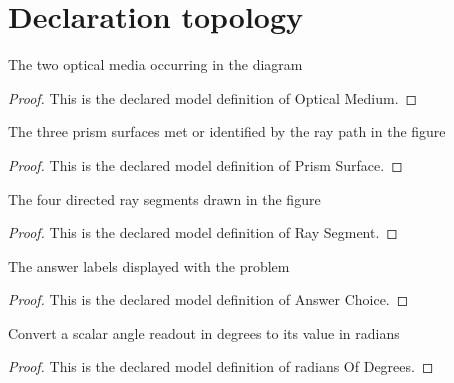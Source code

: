 \section{Declaration topology}
\begin{definition}
  \label{def:physics:phyx-mini-0017:phyxminiproblems-problem0017-opticalmedium}
  The two optical media occurring in the diagram
\end{definition}
\begin{proof}
  This is the declared model definition of Optical Medium.
\end{proof}
\begin{definition}
  \label{def:physics:phyx-mini-0017:phyxminiproblems-problem0017-prismsurface}
  The three prism surfaces met or identified by the ray path in the figure
\end{definition}
\begin{proof}
  This is the declared model definition of Prism Surface.
\end{proof}
\begin{definition}
  \label{def:physics:phyx-mini-0017:phyxminiproblems-problem0017-raysegment}
  The four directed ray segments drawn in the figure
\end{definition}
\begin{proof}
  This is the declared model definition of Ray Segment.
\end{proof}
\begin{definition}
  \label{def:physics:phyx-mini-0017:phyxminiproblems-problem0017-answerchoice}
  The answer labels displayed with the problem
\end{definition}
\begin{proof}
  This is the declared model definition of Answer Choice.
\end{proof}
\begin{definition}
  \label{def:physics:phyx-mini-0017:phyxminiproblems-problem0017-radiansofdegrees}
  Convert a scalar angle readout in degrees to its value in radians
\end{definition}
\begin{proof}
  This is the declared model definition of radians Of Degrees.
\end{proof}
